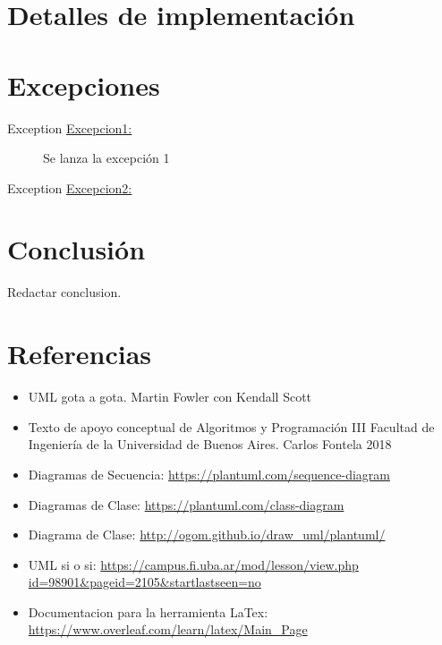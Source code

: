 \documentclass[titlepage,a4paper]{article}
\begin{document}
\section{Detalles de implementación}\label{sec:implementacion}



\section{Excepciones}\label{sec:excepciones}
\begin{description}
\item[Exception \underline{Excepcion1:}] Se lanza la excepción 1
\item[Exception \underline{Excepcion2:}] 
\end{description}


  \section{Conclusión}
  
 	Redactar conclusion.
\newpage
\section{Referencias}

\begin{itemize}
  \item UML gota a gota. Martin Fowler con Kendall Scott
  \item Texto de apoyo conceptual de Algoritmos y Programación III Facultad de Ingeniería de la Universidad de Buenos Aires. Carlos Fontela 2018
  \item Diagramas de Secuencia: \url{https://plantuml.com/sequence-diagram}
  \item Diagramas de Clase: \url{https://plantuml.com/class-diagram}
  \item Diagrama de Clase: \url{http://ogom.github.io/draw_uml/plantuml/}
  \item UML si o si: \url{https://campus.fi.uba.ar/mod/lesson/view.php id=98901&pageid=2105&startlastseen=no}
  \item Documentacion para la herramienta LaTex: \url{https://www.overleaf.com/learn/latex/Main_Page}
\end{itemize}
\end{document}
